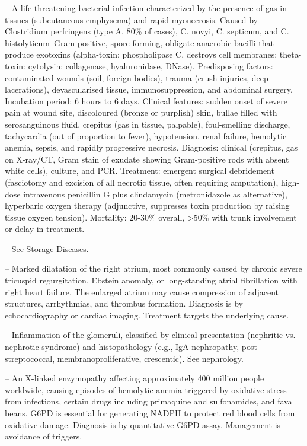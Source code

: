 -- A life-threatening bacterial infection characterized by the presence of gas in tissues (subcutaneous emphysema) and rapid myonecrosis. Caused by Clostridium perfringens (type A, 80\% of cases), C. novyi, C. septicum, and C. histolyticum--Gram-positive, spore-forming, obligate anaerobic bacilli that produce exotoxins (alpha-toxin: phospholipase C, destroys cell membranes; theta-toxin: cytolysin; collagenase, hyaluronidase, DNase). Predisposing factors: contaminated wounds (soil, foreign bodies), trauma (crush injuries, deep lacerations), devascularised tissue, immunosuppression, and abdominal surgery. Incubation period: 6 hours to 6 days. Clinical features: sudden onset of severe pain at wound site, discoloured (bronze or purplish) skin, bullae filled with serosanguinous fluid, crepitus (gas in tissue, palpable), foul-smelling discharge, tachycardia (out of proportion to fever), hypotension, renal failure, hemolytic anemia, sepsis, and rapidly progressive necrosis. Diagnosis: clinical (crepitus, gas on X-ray/CT, Gram stain of exudate showing Gram-positive rods with absent white cells), culture, and PCR. Treatment: emergent surgical debridement (fasciotomy and excision of all necrotic tissue, often requiring amputation), high-dose intravenous penicillin G plus clindamycin (metronidazole as alternative), hyperbaric oxygen therapy (adjunctive, suppresses toxin production by raising tissue oxygen tension). Mortality: 20-30\% overall, >50\% with trunk involvement or delay in treatment.

-- See \hyperlink{Storage Diseases}{Storage Diseases}.

-- Marked dilatation of the right atrium, most commonly caused by chronic severe tricuspid regurgitation, Ebstein anomaly, or long-standing atrial fibrillation with right heart failure. The enlarged atrium may cause compression of adjacent structures, arrhythmias, and thrombus formation. Diagnosis is by echocardiography or cardiac imaging. Treatment targets the underlying cause.

-- Inflammation of the glomeruli, classified by clinical presentation (nephritic vs. nephrotic syndrome) and histopathology (e.g., IgA nephropathy, post-streptococcal, membranoproliferative, crescentic). See nephrology.

-- An X-linked enzymopathy affecting approximately 400 million people worldwide, causing episodes of hemolytic anemia triggered by oxidative stress from infections, certain drugs including primaquine and sulfonamides, and fava beans. G6PD is essential for generating NADPH to protect red blood cells from oxidative damage. Diagnosis is by quantitative G6PD assay. Management is avoidance of triggers.

